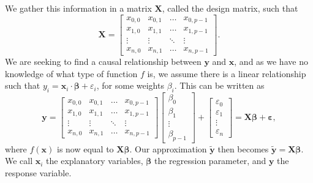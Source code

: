 \documentclass{article}
\begin{document}
We gather this information in a matrix $\textbf{X}$, called the design matrix, such that
\begin{equation*}
    \textbf{X} =
    \begin{bmatrix}
        x_{0,0} & x_{0,1} & \ldots & x_{0, p-1} \\
        x_{1,0} & x_{1,1} & \ldots & x_{1, p-1} \\
        \vdots & \vdots & \ddots & \vdots \\
        x_{n,0} & x_{n,1} & \ldots & x_{n, p-1}
    \end{bmatrix}.
\end{equation*}
We are seeking to find a causal relationship between $\boldsymbol{y}$ and $\boldsymbol{x}$, and as we have no knowledge of what type of function $f$ is, we assume there is a linear relationship such that $y_i = \boldsymbol{x}_i \cdot \boldsymbol{\beta} + \varepsilon_i$, for some weights $\beta_i$. This can be written as
\begin{equation*}
    \boldsymbol{y} = \begin{bmatrix}
        x_{0,0} & x_{0,1} & \ldots & x_{0, p-1} \\
        x_{1,0} & x_{1,1} & \ldots & x_{1, p-1} \\
        \vdots & \vdots & \ddots & \vdots \\
        x_{n,0} & x_{n,1} & \ldots & x_{n, p-1}
    \end{bmatrix}
    \begin{bmatrix}
        \beta_0 \\ \beta_1 \\ \vdots \\ \beta_{p-1}
    \end{bmatrix}
    +
    \begin{bmatrix}
        \varepsilon_0 \\ \varepsilon_1 \\ \vdots \\ \varepsilon_{n}
    \end{bmatrix}
    = \textbf{X} \boldsymbol{\beta} + \boldsymbol{\varepsilon},
\end{equation*}
where $f(\boldsymbol{x})$ is now equal to $\textbf{X} \boldsymbol{\beta}$. Our approximation $\boldsymbol{\tilde{y}}$ then becomes $\boldsymbol{\tilde{y}} = \textbf{X} \boldsymbol{\beta}$. We call $\boldsymbol{x}_i$ the explanatory variables, $\boldsymbol{\beta}$ the regression parameter, and $\boldsymbol{y}$ the response variable.
\end{document}
